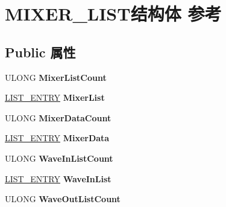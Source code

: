 \hypertarget{struct_m_i_x_e_r___l_i_s_t}{}\section{M\+I\+X\+E\+R\+\_\+\+L\+I\+S\+T结构体 参考}
\label{struct_m_i_x_e_r___l_i_s_t}
\subsection*{Public 属性}
\begin{DoxyCompactItemize}
\item 
\mbox{\label{struct_m_i_x_e_r___l_i_s_t_a74e860f8a5b1e408a7b2f832a4638d00}} 
U\+L\+O\+NG {\bfseries Mixer\+List\+Count}
\item 
\mbox{\label{struct_m_i_x_e_r___l_i_s_t_adaf6eb3a6480391d781091038445979e}} 
\hyperlink{struct___l_i_s_t___e_n_t_r_y}{L\+I\+S\+T\+\_\+\+E\+N\+T\+RY} {\bfseries Mixer\+List}
\item 
\mbox{\label{struct_m_i_x_e_r___l_i_s_t_a07386e34119a0c9f89cc460cdcddb4a1}} 
U\+L\+O\+NG {\bfseries Mixer\+Data\+Count}
\item 
\mbox{\label{struct_m_i_x_e_r___l_i_s_t_a5fbc8774a72e3cbbf2b7bb752593d726}} 
\hyperlink{struct___l_i_s_t___e_n_t_r_y}{L\+I\+S\+T\+\_\+\+E\+N\+T\+RY} {\bfseries Mixer\+Data}
\item 
\mbox{\label{struct_m_i_x_e_r___l_i_s_t_a80a98227330e91891a095f3f2de3ede6}} 
U\+L\+O\+NG {\bfseries Wave\+In\+List\+Count}
\item 
\mbox{\label{struct_m_i_x_e_r___l_i_s_t_a3898f52862953e3b6916d10d0a47fa6a}} 
\hyperlink{struct___l_i_s_t___e_n_t_r_y}{L\+I\+S\+T\+\_\+\+E\+N\+T\+RY} {\bfseries Wave\+In\+List}
\item 
\mbox{\label{struct_m_i_x_e_r___l_i_s_t_a2d42711d4f1f1507aa1c80bfc703786d}} 
U\+L\+O\+NG {\bfseries Wave\+Out\+List\+Count}
\item 
\mbox{\label{struct_m_i_x_e_r___l_i_s_t_a762e8766244fe3e9bd88bd8fedfc8a40}} 

\end{DoxyCompactItemize}
